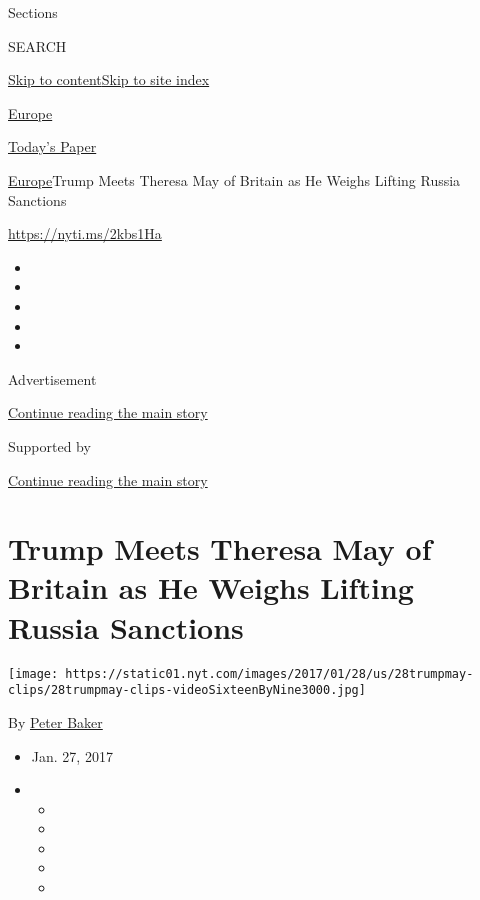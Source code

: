 Sections

SEARCH

\protect\hyperlink{site-content}{Skip to
content}\protect\hyperlink{site-index}{Skip to site index}

\href{https://www.nytimes.com/section/world/europe}{Europe}

\href{https://myaccount.nytimes.com/auth/login?response_type=cookie\&client_id=vi}{}

\href{https://www.nytimes.com/section/todayspaper}{Today's Paper}

\href{/section/world/europe}{Europe}\textbar{}Trump Meets Theresa May of
Britain as He Weighs Lifting Russia Sanctions

\url{https://nyti.ms/2kbs1Ha}

\begin{itemize}
\item
\item
\item
\item
\item
\end{itemize}

Advertisement

\protect\hyperlink{after-top}{Continue reading the main story}

Supported by

\protect\hyperlink{after-sponsor}{Continue reading the main story}

\hypertarget{trump-meets-theresa-may-of-britain-as-he-weighs-lifting-russia-sanctions}{%
\section{Trump Meets Theresa May of Britain as He Weighs Lifting Russia
Sanctions}\label{trump-meets-theresa-may-of-britain-as-he-weighs-lifting-russia-sanctions}}

\texttt{[image: https://static01.nyt.com/images/2017/01/28/us/28trumpmay-clips/28trumpmay-clips-videoSixteenByNine3000.jpg]}

By \href{http://www.nytimes.com/by/peter-baker}{Peter Baker}

\begin{itemize}
\item
  Jan. 27, 2017
\item
  \begin{itemize}
  \item
  \item
  \item
  \item
  \item
  \end{itemize}
\end{itemize}

